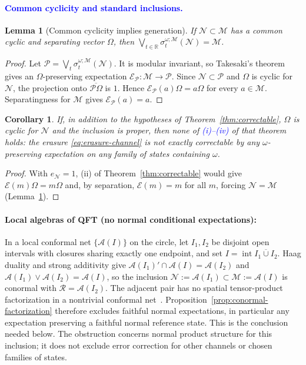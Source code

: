 \documentclass[a4paper,11pt]{article}
\newtheorem{lemma}[theorem]{Lemma}
\newtheorem{corollary}[theorem]{Corollary}
\theoremstyle{definition}
\newcommand{\mP}{\mathcal{P}}
\newcommand{\mR}{\mathcal{R}}
\newcommand{\mN}{\mathcal{N}}
\newcommand{\mM}{\mathcal{M}}
\newcommand{\NL}[1]{\textcolor{blue}{#1}}
\newcommand{\mE}{\mathcal{E}}
\begin{document}
\paragraph{\NL{Common cyclicity and standard inclusions.}}
\label{subsec:common-cyclic}
\begin{lemma}[Common cyclicity implies generation]\label{lem:common-cyclicity-generating}
If $\mN\subset\mM$ has a common cyclic and separating vector $\Omega$, then
$\bigvee_{t\in\mathbb R}\sigma^{\omega;\mM}_t(\mN)=\mM$.
\end{lemma}
\begin{proof}
Let $\mP=\bigvee_t\sigma^{\omega;\mM}_t(\mN)$. It is modular invariant, so Takesaki's theorem
gives an $\Omega$-preserving expectation $\mE_{\mP}:\mM\to\mP$.
Since $\mN\subset\mP$ and $\Omega$ is cyclic for $\mN$, the projection onto
$\overline{\mP\Omega}$ is $1$. Hence $\mE_{\mP}(a)\Omega=a\Omega$ for every $a\in\mM$.
Separatingness for $\mM$ gives $\mE_{\mP}(a)=a$.
\end{proof}
\begin{corollary}\label{cor:common-cyclic-noncorrectable}
If, in addition to the hypotheses of Theorem~\ref{thm:correctable}, $\Omega$ is cyclic for $\mN$ and the inclusion is proper, then none of \NL{{\rm(i)--(iv)}} of that theorem holds: the erasure \eqref{eq:erasure-channel} is not exactly correctable by any $\omega$-preserving expectation on any family of states containing $\omega$.
\end{corollary}

\begin{proof}
With $e_{\mN}=1$, (ii) of Theorem~\ref{thm:correctable} would give $\mE(m)\Omega=m\Omega$ and, by separation, $\mE(m)=m$ for all $m$, forcing $\mN=\mM$ (Lemma~\ref{lem:common-cyclicity-generating}).
\end{proof}

\paragraph{Local algebras of QFT (no normal conditional expectations):}
In a local conformal net $\{\mathcal{A}(I)\}$ on the circle, let $I_1,I_2$ be disjoint
open intervals with closures sharing exactly one endpoint, and set $I=\operatorname{int}\overline{I_1\cup I_2}$.
Haag duality and strong additivity give $\mathcal{A}(I_1)'\cap\mathcal{A}(I)=\mathcal{A}(I_2)$
and $\mathcal{A}(I_1)\vee\mathcal{A}(I_2)=\mathcal{A}(I)$, so the inclusion
$\mN:=\mathcal{A}(I_1)\subset\mM:=\mathcal{A}(I)$ is conormal with
$\mR=\mathcal A(I_2)$. The adjacent pair has no spatial tensor-product
factorization in a nontrivial conformal net~\cite{Wiesbrock1993}.
Proposition~\ref{prop:conormal-factorization} therefore excludes faithful normal expectations, in particular any expectation preserving a faithful normal reference state. This is the conclusion needed below. The obstruction concerns normal product structure for this inclusion; it does not exclude error correction for other channels or chosen families of states.
\end{document}
